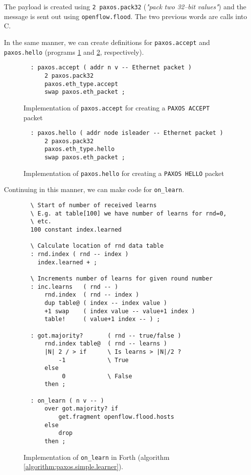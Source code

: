 The payload is created using
\texttt{2 paxos.pack32} (\textit{"pack two 32--bit values"}) and the message
is sent out using \texttt{openflow.flood}.  The two previous words are calls
into C.

In the same manner, we can create definitions for \texttt{paxos.accept} and
\texttt{paxos.hello} (programs \ref{program:forth.paxos.accept} and
\ref{program:forth.paxos.hello}, respectively).

\begin{figure}[H]
  \centering
  \begin{Verbatim}
  : paxos.accept ( addr n v -- Ethernet packet )
      2 paxos.pack32
      paxos.eth_type.accept
      swap paxos.eth_packet ;
  \end{Verbatim}
  \caption{Implementation of \texttt{paxos.accept} for creating a
    \texttt{PAXOS ACCEPT} packet}
  \label{program:forth.paxos.accept}
\end{figure}

\begin{figure}[H]
  \centering
  \begin{Verbatim}
  : paxos.hello ( addr node isleader -- Ethernet packet )
      2 paxos.pack32
      paxos.eth_type.hello
      swap paxos.eth_packet ;
  \end{Verbatim}
  \caption{Implementation of \texttt{paxos.hello} for creating a
    \texttt{PAXOS HELLO} packet}
  \label{program:forth.paxos.hello}
\end{figure}

Continuing in this manner, we can make code for \texttt{on\_{}learn}.

\begin{figure}[H]
  \centering
  \begin{Verbatim}
  \ Start of number of received learns
  \ E.g. at table[100] we have number of learns for rnd=0,
  \ etc.
  100 constant index.learned

  \ Calculate location of rnd data table
  : rnd.index ( rnd -- index )
    index.learned + ;

  \ Increments number of learns for given round number
  : inc.learns   ( rnd -- )
      rnd.index  ( rnd -- index )
      dup table@ ( index -- index value )
      +1 swap    ( index value -- value+1 index )
      table!     ( value+1 index -- ) ;

  : got.majority?       ( rnd -- true/false )
      rnd.index table@  ( rnd -- learns )
      |N| 2 / > if      \ Is learns > |N|/2 ?
          -1            \ True
      else
           0            \ False
      then ;

  : on_learn ( n v -- )
      over got.majority? if
          get.fragment openflow.flood.hosts
      else
          drop
      then ;
  \end{Verbatim}
  \caption{Implementation of \texttt{on\_{}learn} in Forth (algorithm \ref{algorithm:paxos.simple.learner}).}
  \label{program:forth.on-learn}
\end{figure}

